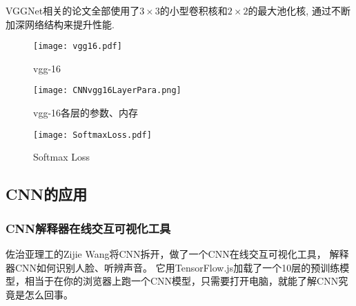 VGGNet相关的论文全部使用了$3\times 3$的小型卷积核和$2\times 2$的最大池化核, 通过不断加深网络结构来提升性能.
\begin{figure}[H]
\centering
\texttt{[image: vgg16.pdf]}
\caption{vgg-16}
\label{CNNvgg16020301}\vspace{-0.4cm}
\end{figure}
\begin{figure}[H]
\centering
\texttt{[image: CNNvgg16LayerPara.png]}
\caption{vgg-16各层的参数、内存}
\label{CNNvgg16LayerPara020302}\vspace{-0.4cm}
\end{figure}
\begin{figure}[H]
\centering
\texttt{[image: SoftmaxLoss.pdf]}
\caption{Softmax Loss}
\label{CNNSoftmaxLoss0203}\vspace{-0.4cm}
\end{figure}
\subsection{CNN的应用}
\subsubsection{CNN解释器在线交互可视化工具}
佐治亚理工的Zijie Wang将CNN拆开，做了一个CNN在线交互可视化工具， 解释器CNN如何识别人脸、听辨声音。
它用TensorFlow.js加载了一个10层的预训练模型，相当于在你的浏览器上跑一个CNN模型，只需要打开电脑，就能了解CNN究竟是怎么回事。

